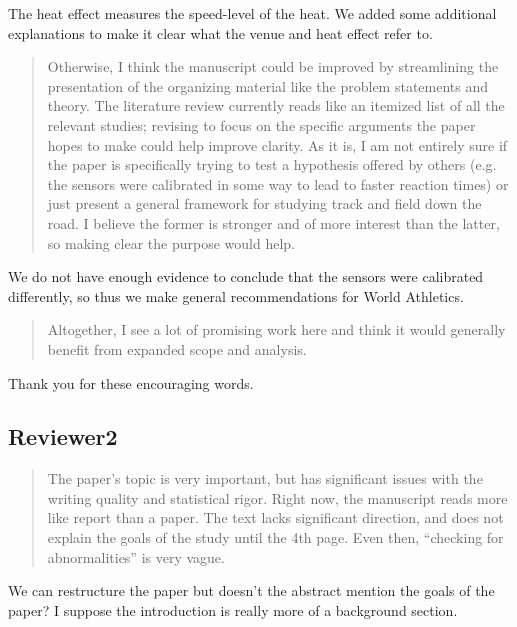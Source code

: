 \documentclass[12pt]{article}
\newenvironment{comment}%
{\begin{quotation}\noindent\small\it\color{darkblue}\ignorespaces%
}{\end{quotation}}
\begin{document}
The heat effect measures the speed-level of the heat.  We added some additional
explanations to make it clear what the venue and heat effect refer to.


\begin{comment}
Otherwise, I think the manuscript could be improved by streamlining the
presentation of the organizing material like the problem statements and theory.
The literature review currently reads like an itemized list of all the relevant
studies; revising to focus on the specific arguments the paper hopes to make
could help improve clarity. As it is, I am not entirely sure if the paper is
specifically trying to test a hypothesis offered by others (e.g. the sensors
were calibrated in some way to lead to faster reaction times) or just present a
general framework for studying track and field down the road. I believe the
former is stronger and of more interest than the latter, so making clear the
purpose would help.

\end{comment}  
We do not have enough evidence to conclude that the sensors were calibrated
differently, so thus we make general recommendations for World Athletics.

\begin{comment}
Altogether, I see a lot of promising work here and think it would generally
benefit from expanded scope and analysis.
\end{comment}


Thank you for these encouraging words.

\subsection*{Reviewer2}


\begin{comment}
The paper’s topic is very important, but has significant issues with the writing
quality and statistical rigor. Right now, the manuscript reads more like report
than a paper. The text lacks significant direction, and does not explain the
goals of the study until the 4th page. Even then, “checking for abnormalities”
is very vague.

\end{comment}


We can restructure the paper but doesn't the abstract mention the goals of the
paper? I suppose the introduction is really more of a background section.
\end{document}
